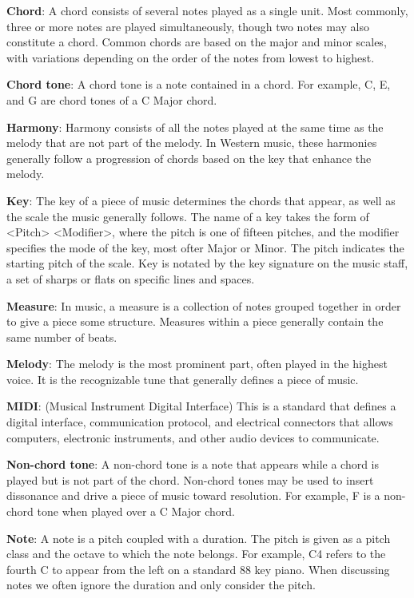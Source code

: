 \textbf{Chord}: A chord consists of several notes played as a single unit.
Most commonly, three or more notes are played simultaneously, though two notes may also constitute a chord.
Common chords are based on the major and minor scales, with variations depending on the order of the notes from lowest to highest.

\textbf{Chord tone}: A chord tone is a note contained in a chord.
For example, C, E, and G are chord tones of a C Major chord.

\textbf{Harmony}: Harmony consists of all the notes played at the same time as the melody that are not part of the melody.
In Western music, these harmonies generally follow a progression of chords based on the key that enhance the melody.

\textbf{Key}: The key of a piece of music determines the chords that appear, as well as the scale the music generally follows.
The name of a key takes the form of <Pitch> <Modifier>, where the pitch is one of fifteen pitches, and the modifier specifies the mode of the key, most ofter Major or Minor.
The pitch indicates the starting pitch of the scale.
Key is notated by the key signature on the music staff, a set of sharps or flats on specific lines and spaces.

\textbf{Measure}: In music, a measure is a collection of notes grouped together in order to give a piece some structure.
Measures within a piece generally contain the same number of beats.

\textbf{Melody}: The melody is the most prominent part, often played in the highest voice.
It is the recognizable tune that generally defines a piece of music.

\textbf{MIDI}: (Musical Instrument Digital Interface) This is a standard that defines a digital interface, communication protocol, and electrical connectors that allows computers, electronic instruments, and other audio devices to communicate.

\textbf{Non-chord tone}: A non-chord tone is a note that appears while a chord is played but is not part of the chord.
Non-chord tones may be used to insert dissonance and drive a piece of music toward resolution.
For example, F is a non-chord tone when played over a C Major chord.

\textbf{Note}: A note is a pitch coupled with a duration.
The pitch is given as a pitch class and the octave to which the note belongs.
For example, C4 refers to the fourth C to appear from the left on a standard $88$ key piano.
When discussing notes we often ignore the duration and only consider the pitch.

